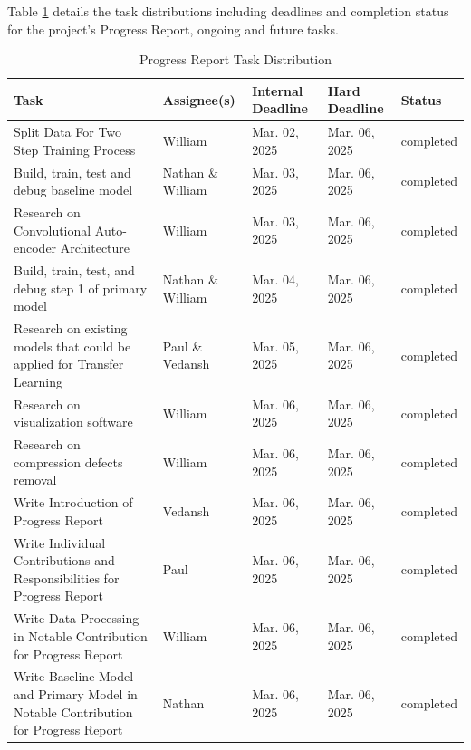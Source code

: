 \documentclass{article} %
\begin{document}
Table \ref{Progress_Report_Task_Distribution} details the task distributions including deadlines and completion status for the project’s Progress Report, ongoing and future tasks.

\begin{table}[t]
    \caption{Progress Report Task Distribution}
    \label{Progress_Report_Task_Distribution}
    \begin{center}
    \begin{tabular}{|>{\raggedright\arraybackslash}p{4cm}|>{\raggedright\arraybackslash}p{2.5cm}|>{\raggedright\arraybackslash}p{2cm}|>{\raggedright\arraybackslash}p{2cm}|>{\raggedright\arraybackslash}p{1.5cm}|}
    \hline
    \textbf{Task} & \textbf{Assignee(s)} & \textbf{Internal Deadline} & \textbf{Hard Deadline} & \textbf{Status} \\
    \hline
    Split Data For Two Step Training Process & William & Mar. 02, 2025 & Mar. 06, 2025 & completed \\
    \hline
    Build, train, test and debug baseline model & Nathan \& William & Mar. 03, 2025 & Mar. 06, 2025 & completed \\
    \hline
    Research on Convolutional Auto-encoder Architecture & William & Mar. 03, 2025 & Mar. 06, 2025 & completed \\
    \hline
    Build, train, test, and debug step 1 of primary model & Nathan \& William & Mar. 04, 2025 & Mar. 06, 2025 & completed \\
    \hline
    Research on existing models that could be applied for Transfer Learning & Paul \& Vedansh & Mar. 05, 2025 & Mar. 06, 2025 & completed \\
    \hline
    Research on visualization software & William & Mar. 06, 2025 & Mar. 06, 2025 & completed \\
    \hline
    Research on compression defects removal & William & Mar. 06, 2025 & Mar. 06, 2025 & completed \\
    \hline
    Write Introduction of Progress Report & Vedansh & Mar. 06, 2025 & Mar. 06, 2025 & completed \\
    \hline
    Write Individual Contributions and Responsibilities for Progress Report & Paul & Mar. 06, 2025 & Mar. 06, 2025 & completed \\
    \hline
    Write Data Processing in Notable Contribution for Progress Report & William & Mar. 06, 2025 & Mar. 06, 2025 & completed \\
    \hline
    Write Baseline Model and Primary Model in Notable Contribution for Progress Report & Nathan & Mar. 06, 2025 & Mar. 06, 2025 & completed \\

\end{tabular}
\end{center}
\end{table}
\end{document}
